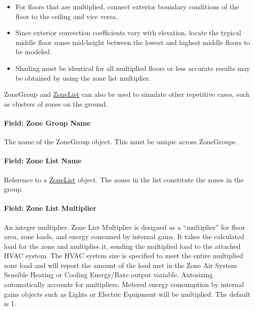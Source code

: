 \begin{itemize}
\item
  For floors that are multiplied, connect exterior boundary conditions of the floor to the ceiling and vice versa.
\item
  Since exterior convection coefficients vary with elevation, locate the typical middle floor zones mid-height between the lowest and highest middle floors to be modeled.
\item
  Shading must be identical for all multiplied floors or less accurate results may be obtained by using the zone list multiplier.
\end{itemize}

ZoneGroup and \hyperref[zonelist]{ZoneList} can also be used to simulate other repetitive cases, such as clusters of zones on the ground.

\paragraph{Field: Zone Group Name}\label{field-zone-group-name}

The name of the ZoneGroup object. This must be unique across ZoneGroups.

\paragraph{Field: Zone List Name}\label{field-zone-list-name-1}

Reference to a \hyperref[zonelist]{ZoneList} object. The zones in the list constitute the zones in the group.

\paragraph{Field: Zone List Multiplier}\label{field-zone-list-multiplier}

An integer multiplier. Zone List Multiplier is designed as a ``multiplier'' for floor area, zone loads, and energy consumed by internal gains. It takes the calculated load for the zone and multiplies it, sending the multiplied load to the attached HVAC system. The HVAC system size is specified to meet the entire multiplied zone load and will report the amount of the load met in the Zone Air System Sensible Heating or Cooling Energy/Rate output variable. Autosizing automatically accounts for multipliers. Metered energy consumption by internal gains objects such as Lights or Electric Equipment will be multiplied. The default is 1.

